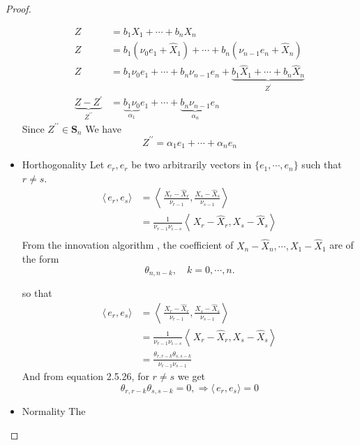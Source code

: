 \documentclass[11pt, oneside]{article}   	%
\begin{document}
\begin{proof}
\begin{itemize}
\begin{equation}
\begin{split}
Z &= b_{1}X_{1} + \cdots + b_{n}X_{n}\\
Z&=b_{1}(\nu_{0}e_{1} + \hat{X}_{1}) + \cdots + b_{n}(\nu_{n-1}e_{n} + \hat{X}_{n})\\
Z&=b_{1}\nu_{0}e_{1}  + \cdots + b_{n}\nu_{n-1}e_{n} + \underbrace{b_{1}\hat{X}_{1} + \cdots + b_{n}\hat{X}_{n}}_{Z^{\prime}}\\
\underbrace{Z-Z^{\prime}}_{Z^{\prime\prime}}&=\underbrace{b_{1}\nu_{0}}_{\alpha_{1}}e_{1}  + \cdots + \underbrace{b_{n}\nu_{n-1}}_{\alpha_{n}}e_{n} 
\end{split}
\end{equation} 
Since $Z^{\prime\prime} \in \textbf{S}_{n}$
We have 
\begin{equation}
Z^{\prime\prime} = \alpha_{1}e_{1}  + \cdots + \alpha_{n}e_{n} 
\end{equation}

\item Horthogonality
Let $e_{r}, e_{r}$ be two arbitrarily vectors in $\{ e_{1}, \cdots, e_{n}   \}$ such that $r \neq s$.
\begin{equation}
\begin{split}
\langle\,e_{r},e_{s}\rangle & = \left\langle\,\frac{X_{r}-\hat{X}_{r}}{\nu_{r-1}} ,\frac{X_{s}-\hat{X}_{s}}{\nu_{s-1}}\right\rangle\\
&=\frac{1}{\nu_{r-1}\nu_{i-s}}\left\langle\,X_{r}-\hat{X}_{r} ,X_{s}-\hat{X}_{s}\right\rangle\\
\end{split}
\end{equation}
From the innovation algorithm \cite{petter}, the coefficient of $X_{n}-\hat{X}_{n}, \cdots, X_{1}-\hat{X}_{1}$ are of the form 
\begin{equation}
\theta_{n,n-k}, \quad k=0, \cdots, n.
\end{equation}

so that 
\begin{equation}
\begin{split}
\langle\,e_{r},e_{s}\rangle & = \left\langle\,\frac{X_{r}-\hat{X}_{r}}{\nu_{r-1}} ,\frac{X_{s}-\hat{X}_{s}}{\nu_{s-1}}\right\rangle\\
&=\frac{1}{\nu_{r-1}\nu_{i-s}}\left\langle\,X_{r}-\hat{X}_{r} ,X_{s}-\hat{X}_{s}\right\rangle\\
&= \frac{\theta_{r,r-k} \theta_{s,s-k}}{\nu_{r-1}\nu_{s-1}}
\end{split}
\end{equation}
And from \cite{petter} equation 2.5.26, for $r\neq s$ we get 
\begin{equation}
\theta_{r,r-k} \theta_{s,s-k} = 0, \Rightarrow \langle\,e_{r},e_{s}\rangle = 0
\end{equation}

\item Normality
The






\end{itemize}
\end{proof}
\end{document}
